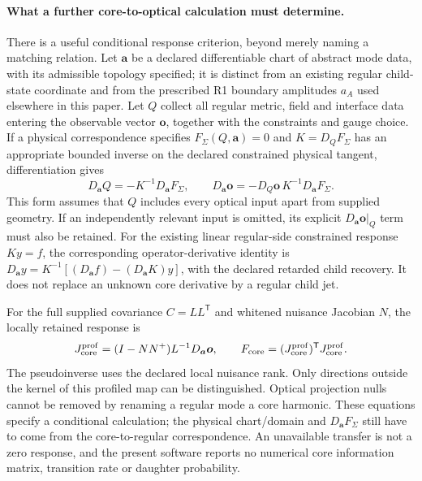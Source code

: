 \paragraph{What a further core-to-optical calculation must determine.}
There is a useful conditional response criterion, beyond merely naming
a matching relation. Let $\boldsymbol a$ be a declared differentiable
chart of abstract mode data, with its admissible topology specified;
it is distinct from an existing regular child-state coordinate and from
the prescribed R1 boundary amplitudes $a_A$ used elsewhere in this paper.
Let $Q$ collect all regular metric, field and interface data entering
the observable vector $\boldsymbol o$, together with the constraints
and gauge choice. If a physical correspondence specifies
$F_\Sigma(Q,\boldsymbol a)=0$ and
$K=D_QF_\Sigma$ has an appropriate bounded inverse on the declared
constrained physical tangent, differentiation gives
\begin{equation}
 D_{\boldsymbol a}Q=-K^{-1}D_{\boldsymbol a}F_\Sigma,\qquad
 D_{\boldsymbol a}\boldsymbol o
 =-D_Q\boldsymbol o\,K^{-1}D_{\boldsymbol a}F_\Sigma.
 \label{eq:core-optical-conditional-response}
\end{equation}
This form assumes that $Q$ includes every optical input apart from
supplied geometry. If an independently relevant input is omitted, its
explicit $D_{\boldsymbol a}\boldsymbol o|_Q$ term must also be retained.
For the existing linear regular-side constrained response $Ky=f$, the
corresponding operator-derivative identity is
$D_{\boldsymbol a}y=K^{-1}[(D_{\boldsymbol a}f)
 -(D_{\boldsymbol a}K)y]$, with the declared retarded child recovery.
It does not replace an unknown core derivative by a regular child jet.

For the full supplied covariance $C=LL^{\mathsf T}$ and whitened
nuisance Jacobian $N$, the locally retained response is
\begin{equation}
 J_{\rm core}^{\rm prof}
 =(I-NN^+)L^{-1}D_{\boldsymbol a}\boldsymbol o,\qquad
 F_{\rm core}=(J_{\rm core}^{\rm prof})^{\mathsf T}
                  J_{\rm core}^{\rm prof}.
 \label{eq:core-profiled-information}
\end{equation}
The pseudoinverse uses the declared local nuisance rank. Only directions
outside the kernel of this profiled map can be distinguished. Optical
projection nulls cannot be removed by renaming a regular mode a core
harmonic. These equations specify a conditional calculation; the physical
chart/domain and $D_{\boldsymbol a}F_\Sigma$ still have to come from the
core-to-regular correspondence. An unavailable transfer is not a zero
response, and the present software reports no numerical core information
matrix, transition rate or daughter probability.

